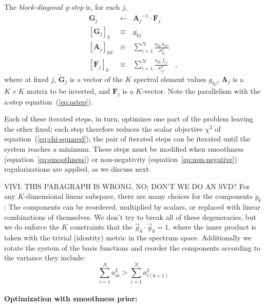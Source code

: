 \documentclass[12pt,preprint]{aastex}
\newcommand{\equationname}{equation}
\newcommand{\tv}[1]{\boldsymbol{#1}}
\newcommand{\inverse}[1]{{#1}^{-1}}
\begin{document}
The \emph{block-diagonal g-step} is, for each $j$,
\begin{eqnarray}\label{eq:gstep}\displaystyle
\tv{G}_j & \gets & \inverse{\tv{A}_j}\cdot\tv{F}_j \nonumber\\
\left[\tv{G}_j\right]_k & \equiv & g_{kj} \nonumber\\
\left[\tv{A}_j\right]_{kk'} & \equiv & \sum_{i=1}^{N} \frac{a_{ik}\,a_{ik'}}{\sigma_{ij}^2} \nonumber\\
\left[\tv{F}_j\right]_k     & \equiv & \sum_{i=1}^{N} \frac{a_{ik}\,f_{i j}}{\sigma_{ij}^2}
\quad ,
\end{eqnarray}
where at fixed $j$, $\tv{G}_j$ is a vector of the $K$ spectral element
values $g_{kj}$, $\tv{A}_j$ is a $K\times K$ matrix to be inverted, and
$\tv{F}_j$ is a $K$-vector.  Note the parallelism with the a-step
\equationname~(\ref{eq:astep}).

Each of these iterated steps, in turn, optimizes one part of the
problem leaving the other fixed; each step therefore reduces the
scalar objective $\chi^2$ of \equationname~(\ref{eq:chi-squared}); the
pair of iterated steps can be iterated until the system reaches a
minimum.  These steps must be modified when smoothness
(\equationname~\ref{eq:smoothness}) or non-negativity
(\equationname~\ref{eq:non-negative}) regularizations are applied, as
we discuss next.

VIVI: THIS PARAGRAPH IS WRONG, NO; DON'T WE DO AN SVD?
For any $K$-dimensional linear subspace, there are many choices for
the components $g_k$: The components can be reordered, multiplied by
scalars, or replaced with linear combinations of themselves.  We don't
try to break all of these degeneracies, but we do enforce the
$K$ constraints that the $\vec{g}_k\cdot\vec{g}_k=1$, where the inner
product is taken with the trivial (identity) metric in the spectrum
space. Additionally we rotate the system of the basis functions and
reorder the components according to the variance they include:
\begin{equation}\label{eq:ordering}
\sum_{i=1}^{N}a_{ik}^2>\sum_{i=1}^{N}a_{i(k+1)}^2
\end{equation}

\paragraph{Optimization with smoothness prior:}
\end{document}
